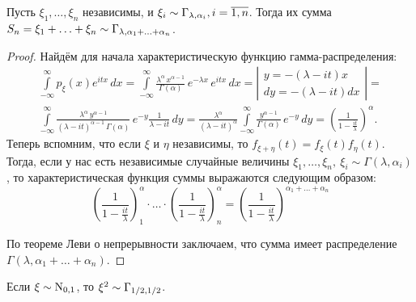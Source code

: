 \begin{lem}
    Пусть $\xi_{1}, \ldots, \xi_{n}$ независимы, и $\xi_i \sim \operatorname{\Gamma}_{\lambda, \alpha_i}, i=\overline{1,n}$. 
    Тогда их сумма $S_{n}=\xi_{1}+\ldots+\xi_{n} \sim \operatorname{\Gamma}_{\lambda, \alpha_1 + \ldots + \alpha_n}$.
\end{lem}
\begin{proof}
    Найдём для начала характеристическую функцию гамма-распределения:
    \begin{multline*}
        \int\limits_{-\infty}^{\infty} p_{\xi}(x) e^{itx} \, dx = 
        \int\limits_{-\infty}^{\infty} \frac{\lambda^\alpha \, x^{\alpha - 1}}{\Gamma(\alpha)} \, e^{-\lambda x}\, e^{itx} \,dx = 
        \left| \begin{array}{c}
            y  = -(\lambda - it)x \\
            dy = -(\lambda - it)dx
        \end{array} \right| = \\
        \int\limits_{-\infty}^{\infty} \frac{\lambda^\alpha \, y^{\alpha - 1}}{(\lambda - it)^{\alpha - 1} \, \Gamma(\alpha)} \, e^{-y} \frac{1}{\lambda - it} \,dy = 
        \frac{\lambda^\alpha}{(\lambda - it)^{\alpha}} \int\limits_{-\infty}^{\infty} \frac{y^{\alpha - 1}}{\Gamma(\alpha)} \, e^{-y} \, dy = 
        \left(\frac{1}{1 - \frac{it}{\lambda}} \right)^\alpha \!.
    \end{multline*}
    Теперь вспомним, что если $\xi$ и $\eta$ независимы, то $f_{\xi + \eta}(t) = f_{\xi}(t) f_{\eta}(t)$.
    Тогда, если у нас есть независимые случайные величины $\xi_1, \ldots, \xi_n, \: \xi_i \sim \Gamma(\lambda, \alpha_i)$, 
    то характеристическая функция суммы выражаются следующим образом:
    \begin{equation*}
        \left(\frac{1}{1 - \frac{it}{\lambda}} \right)^\alpha_1 \cdot \ldots \cdot \left(\frac{1}{1 - \frac{it}{\lambda}} \right)^\alpha_n = 
        \left(\frac{1}{1 - \frac{it}{\lambda}} \right)^{\alpha_1 + \ldots + \alpha_n}
    \end{equation*}

    По теореме Леви о непрерывности заключаем, что сумма имеет распределение $\Gamma(\lambda, \alpha_1 + \ldots + \alpha_n)$.
\end{proof}

\begin{lem}
    Если $\xi \sim \operatorname{\mathrm{N}}_{0,1}$, то $\xi^2 \sim \operatorname{\Gamma}_{1/2, 1/2}$.
\end{lem}

